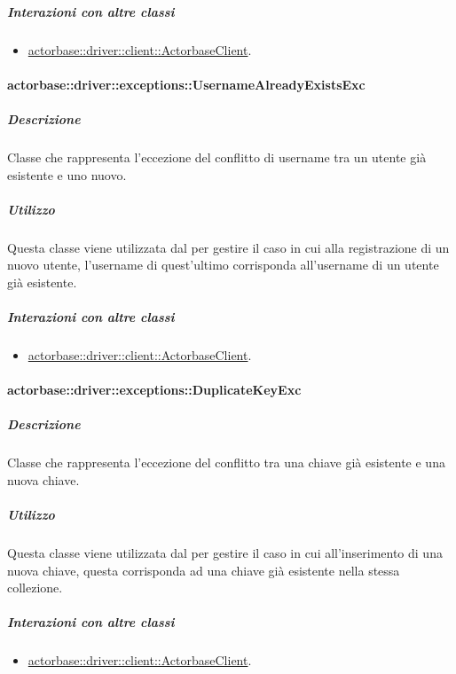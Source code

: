 \documentclass{scalatekids-article}
\begin{document}
\subparagraph{Interazioni con altre classi}

\begin{itemize}
\item \hyperref[sec:actorbase::driver::client::ActorbaseClient]{actorbase::driver::client::ActorbaseClient}.
\end{itemize}

\paragraph{actorbase::driver::exceptions::UsernameAlreadyExistsExc}

\subparagraph{Descrizione}

Classe che rappresenta l'eccezione del conflitto di username tra un utente già esistente e uno nuovo.

\subparagraph{Utilizzo}

Questa classe viene utilizzata dal  per gestire il caso in cui alla registrazione di un nuovo utente, l'username di quest'ultimo corrisponda all'username di un utente già esistente.

\subparagraph{Interazioni con altre classi}

\begin{itemize}
\item \hyperref[sec:actorbase::driver::client::ActorbaseClient]{actorbase::driver::client::ActorbaseClient}.
\end{itemize}

\paragraph{actorbase::driver::exceptions::DuplicateKeyExc}

\subparagraph{Descrizione}

Classe che rappresenta l'eccezione del conflitto tra una chiave già esistente e una nuova chiave.

\subparagraph{Utilizzo}

Questa classe viene utilizzata dal  per gestire il caso in cui all'inserimento di una nuova chiave, questa corrisponda ad una chiave già esistente nella stessa collezione.

\subparagraph{Interazioni con altre classi}

\begin{itemize}
\item \hyperref[sec:actorbase::driver::client::ActorbaseClient]{actorbase::driver::client::ActorbaseClient}.
\end{itemize}
\end{document}
